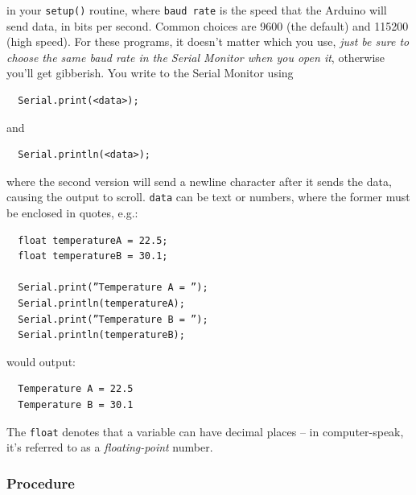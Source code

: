 \documentclass[11pt]{article} %
\begin{document}
in your \verb|setup()| routine, where \verb|baud rate| is the speed that the Arduino will send data, in bits per second. Common choices are 9600 (the default) and 115200 (high speed). For these programs, it doesn’t matter which you use, \emph{just be sure to choose the same baud rate in the Serial Monitor when you open it}, otherwise you'll get gibberish. You write to the Serial Monitor using 

\begin{verbatim}
  Serial.print(<data>);
\end{verbatim}

and

\begin{verbatim}
  Serial.println(<data>);
\end{verbatim}

where the second version will send a newline character after it sends the data, causing the output to scroll. \verb|data| can be text or numbers, where the former must be enclosed in quotes, e.g.:

\begin{verbatim}
  float temperatureA = 22.5;
  float temperatureB = 30.1;

  Serial.print(”Temperature A = ”);
  Serial.println(temperatureA);
  Serial.print(”Temperature B = ”);
  Serial.println(temperatureB);
\end{verbatim}

would output:

\begin{verbatim}
  Temperature A = 22.5
  Temperature B = 30.1
\end{verbatim}

The \verb|float| denotes that a variable can have decimal places -- in computer-speak, it's referred to as a \emph{floating-point} number.

\subsubsection*{Procedure}
\end{document}
